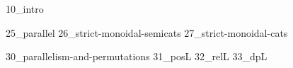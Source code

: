 
\label{chap:parallelism}
{10_intro}

{25_parallel}
{26_strict-monoidal-semicats}
{27_strict-monoidal-cats}

{30_parallelism-and-permutations}
{31_posL}
{32_relL}
{33_dpL}

